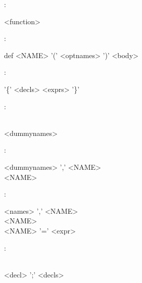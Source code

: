 \documentclass[12pt]{article}
\newcommand{\bs}[2]{%
\begin{minipage}{5in}%
\begin{syntdiag*}[\left{#1}\right{#2}][5in]%
}
\newcommand{\es}{\end{syntdiag*}\end{minipage}}
\begin{document}
\begin{framed}
:\\
\indent \bs {>>-} {-><} 
\begin{rep}<function>\\ \end{rep} 
\es
\end{framed}

\begin{framed}
: \\
\indent \bs {>>-} {-><} 
def <NAME> '(' <optnames>  ')' <body> 
\es
\end{framed}

\begin{framed}
: \\
\indent \bs {>>-} {-><}
'\{' <decls> <exprs> '\}'
\es
\end{framed}

\begin{framed}
:\\
\indent \bs {>>-} {-><} 
\begin{stack} 
	\\ 
	<dummynames> 
\end{stack} 
\es
\end{framed}

\begin{framed}
:\\
\indent \bs {>>-} {-><} 
\begin{stack} 
	<dummynames> ',' <NAME> \\ 
	<NAME>
\end{stack} 
\es
\end{framed}

\begin{framed}
:\\
\indent \bs {>>-} {-><} 
\begin{stack} 
	<names> ',' <NAME> \\ 
	<NAME> \\ 
	<NAME> '=' <expr> 
\end{stack} 
\es
\end{framed}

\begin{framed}
:\\
\indent \bs {>>-} {-><} 
\begin{stack} 
	\\ 
	<decl> ';' <decls> 
\end{stack} 
\es
\end{framed}
\end{document}
